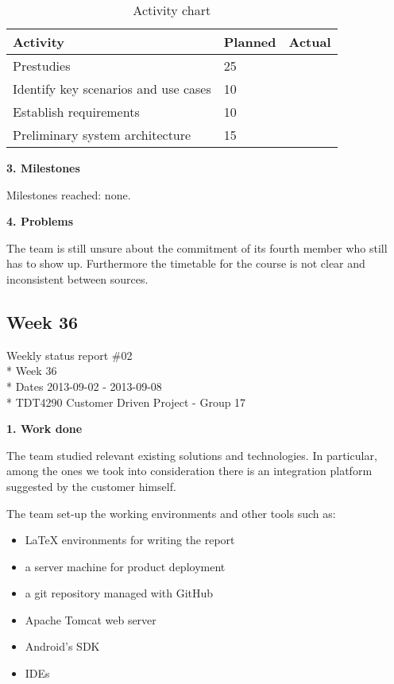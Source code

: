 \begin{table}
\begin{center}
\begin{tabular}{ l | l | l }
  \hline
  Activity & Planned & Actual \\
  \hline\noalign{\smallskip}\noalign{\smallskip}\hline
  Prestudies & 25 &  \\
  Identify key scenarios and use cases & 10 &  \\
  Establish requirements & 10 &  \\
  Preliminary system architecture & 15 &  \\
  \hline
\end{tabular}
\end{center}
\caption{Activity chart}
\label{table:activityChartStatusReportWeek35}
\end{table}


\textbf{3. Milestones}

Milestones reached: none.

\textbf{4. Problems}

The team is still unsure about the commitment of its fourth member
who still has to show up. Furthermore the timetable for the course
is not clear and inconsistent between sources.


\newpage
\subsection{Week 36}

\begin{center}
Weekly status report \#02\\*
Week 36 \\*
Dates 2013-09-02 - 2013-09-08 \\*
TDT4290 Customer Driven Project - Group 17
\end{center}

\textbf{1. Work done}

The team studied relevant existing solutions and technologies.
In particular, among the ones we took into consideration there is an integration platform suggested by the customer himself.

The team set-up the working environments and other tools such as:
\begin{itemize}
\item LaTeX environments for writing the report
\item a server machine for product deployment
\item a git repository managed with GitHub
\item Apache Tomcat web server
\item Android’s SDK
\item IDEs
\end{itemize}

